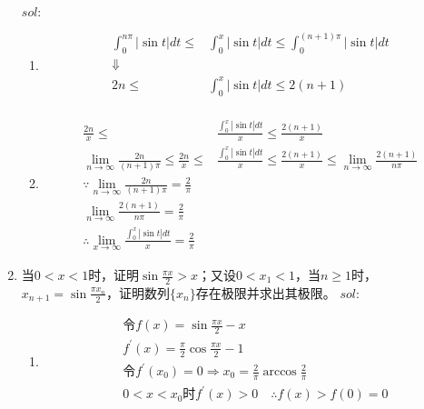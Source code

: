 \begin{enumerate}[{例}1.]
        $sol:$
        \begin{enumerate}[(1)]
            \item
                \begin{align*}
                    \int_0^{n\pi}\left|\sin t\right|dt\leq&\int_0^x\left|\sin t\right|dt\leq\int_0^{(n+1)\pi}\left|\sin t\right|dt\\
                    \Downarrow&\\
                    2n\leq&\int_0^x\left|\sin t\right|dt\leq 2(n+1)\\
                \end{align*}
            \item
                \begin{align*}
                    \frac{2n}{x}\leq&\frac{\int_0^x\left|\sin t\right|dt}{x}\leq \frac{2(n+1)}{x}\\
                    \lim_{n\to\infty}\frac{2n}{(n+1)\pi}\leq\frac{2n}{x}\leq&\frac{\int_0^x\left|\sin t\right|dt}{x}\leq \frac{2(n+1)}{x}\leq\lim_{n\to\infty}\frac{2(n+1)}{n\pi}\\
                    \because\lim_{n\to\infty}\frac{2n}{(n+1)\pi}=\frac{2}{\pi}\\
                    \lim_{n\to\infty}\frac{2(n+1)}{n\pi}=\frac{2}{\pi}\\
                    \therefore\lim_{x\to\infty}\frac{\int_0^x \left|\sin t \right|dt}{x}=\frac{2}{\pi}
                \end{align*}
        \end{enumerate}
    \item 当$0<x<1$时，证明$\sin \frac{\pi x}{2} > x$；又设$0<x_1<1$，当$n\geq 1$时，$x_{n+1}=\sin\frac{\pi x_n}{2}$，证明数列$\{x_n\}$存在极限并求出其极限。
        $sol:$
        \begin{enumerate}[(1)]
            \item
                \begin{align*}
                    &\mbox{令}f(x)=\sin\frac{\pi x}{2}-x\\
                    &f^{\prime}(x)=\frac{\pi}{2}\cos \frac{\pi x}{2}-1\\
                    &\mbox{令}f^{\prime}(x_0)=0\Rightarrow x_0=\frac{2}{\pi}\arccos \frac{2}{\pi}\\
                    &0<x<x_0\mbox{时}f^{\prime}(x)>0\quad\therefore f(x)>f(0)=0\\

\end{align*}
\end{enumerate}
\end{enumerate}
